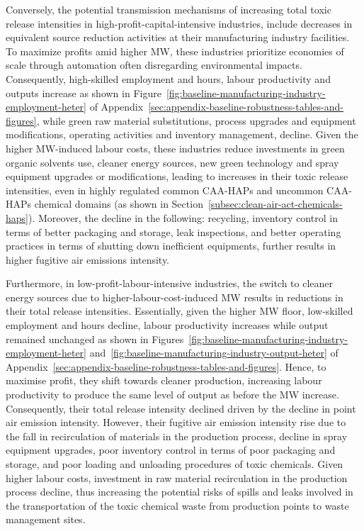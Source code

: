 \documentclass[authoryear, preprint, twocolumn, 1p]{elsarticle}
\begin{document}
    Conversely, the potential transmission mechanisms of increasing total toxic release intensities in high-profit-capital-intensive industries, include decreases in equivalent source reduction activities at their manufacturing industry facilities. To maximize profits amid higher MW, these industries prioritize economies of scale through automation often disregarding environmental impacts. Consequently, high-skilled employment and hours, labour productivity and outputs increase as shown in Figure~\ref{fig:baseline-manufacturing-industry-employment-heter} of Appendix~\ref{sec:appendix-baseline-robustness-tables-and-figures}, while green raw material substitutions, process upgrades and equipment modifications, operating activities and inventory management, decline. Given the higher MW-induced labour costs, these industries reduce investments in green organic solvents use, cleaner energy sources, new green technology and spray equipment upgrades or modifications, leading to increases in their toxic release intensities, even in highly regulated common CAA-HAPs and uncommon CAA-HAPs chemical domains (as shown in Section~\ref{subsec:clean-air-act-chemicals-haps}). Moreover, the decline in the following: recycling, inventory control in terms of better packaging and storage, leak inspections, and better operating practices in terms of shutting down inefficient equipments, further results in higher fugitive air emissions intensity.
    

    Furthermore, in low-profit-labour-intensive industries, the switch to cleaner energy sources due to higher-labour-cost-induced MW results in reductions in their total release intensities. Essentially, given the higher MW floor, low-skilled employment and hours decline, labour productivity increases while output remained unchanged as shown in Figures~\ref{fig:baseline-manufacturing-industry-employment-heter} and~\ref{fig:baseline-manufacturing-industry-output-heter} of Appendix~\ref{sec:appendix-baseline-robustness-tables-and-figures}. Hence, to maximise profit, they shift towards cleaner production, increasing labour productivity to produce the same level of output as before the MW increase. Consequently, their total release intensity declined driven by the decline in point air emission intensity. However, their fugitive air emission intensity rise due to the fall in recirculation of materials in the production process, decline in spray equipment upgrades, poor inventory control in terms of poor packaging and storage, and poor loading and unloading procedures of toxic chemicals. Given higher labour costs, investment in raw material recirculation in the production process decline, thus increasing the potential risks of spills and leaks involved in the transportation of the toxic chemical waste from production points to waste management sites.
\end{document}
